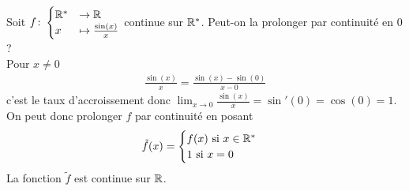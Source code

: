 \begin{exemple}
Soit 
$
f \colon 
\begin{cases}
\mathbb{R}^* &\to \mathbb{R} \\
x &\mapsto \frac{\sin(x)}{x}
\end{cases}
$
continue sur $\mathbb{R}^*$. Peut-on la prolonger par continuité en $0$ ?
\\
Pour $x \neq 0$
\begin{align*}
\frac{\sin (x)}{x} = \frac{\sin (x) - \sin (0)}{x - 0}
\end{align*}
c'est le taux d'accroissement donc $\lim_{x \to 0} \frac{\sin (x)}{x} = \sin' (0) = \cos (0) = 1$.
On peut donc prolonger $f$ par continuité en posant
\begin{align*}
\tilde{f}(x) =
\begin{cases}
f(x) \text{ si } x \in \mathbb{R}^* \\
1 \text{ si } x = 0
\end{cases} 
\end{align*}
La fonction $\tilde{f}$ est continue sur $\mathbb{R}$.
\end{exemple}